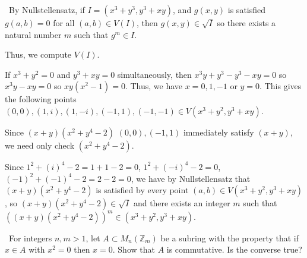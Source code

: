 \documentclass[12pt]{Qual}
\begin{document}
\begin{solution}$\,$
By Nullstellensatz, if $I=(x^3+y^3,y^3+xy)$, and $g(x,y)$ is satisfied $g(a,b)=0$ for all $(a,b)\in V(I)$, then $g(x,y)\in\sqrt{I}$ so there exists a natural number $m$ such that $g^m\in I.$

Thus, we compute $V(I).$

If $x^3+y^2=0$ and $y^3+xy=0$ simultaneously, then $x^3y+y^3-y^3-xy=0$ so $x^3y-xy=0$ so $xy(x^2-1)=0$. Thus, we have $x=0,1,-1$ or $y=0$. This gives the following points $(0,0),(1,i),(1,-i),(-1,1),(-1,-1)\in V(x^3+y^2,y^3+xy)$.

Since $(x+y)(x^2+y^4-2)$ $(0,0),(-1,1)$ immediately satisfy $(x+y)$, we need only check $(x^2+y^4-2)$.

Since $1^2+(i)^4-2=1+1-2=0$, $1^2+(-i)^4-2=0$, $(-1)^2+(-1)^4-2=2-2=0$, we have by Nullstellensatz that $(x+y)(x^2+y^4-2)$ is satisfied by every point $(a,b)\in V(x^3+y^2,y^3+xy)$, so $(x+y)(x^2+y^4-2)\in\sqrt{I}$ and there exists an integer $m$ such that $((x+y)(x^2+y^4-2))^m\in(x^3+y^2,y^3+xy)$.
\end{solution}
\newpage


\begin{problem} $\,$
For integers $n,m>1$, let $A\subset M_n(\mathbb{Z}_m)$ be a subring with the property that if $x\in A$ with $x^2=0$ then $x=0.$ Show that $A$ is commutative. Is the converse true?
\end{problem}
\end{document}
